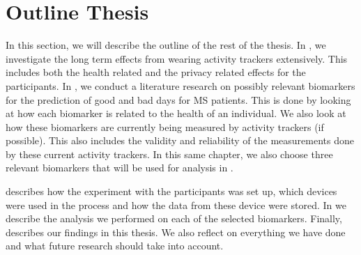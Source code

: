 \section{Outline Thesis}
In this section, we will describe the outline of the rest of the thesis. 
In , we investigate the long term effects from wearing activity trackers extensively.
This includes both the health related and the privacy related effects for the participants.
In , we conduct a literature research on possibly relevant biomarkers for the prediction of good and bad days for MS patients.
This is done by looking at how each biomarker is related to the health of an individual. 
We also look at how these biomarkers are currently being measured by activity trackers (if possible).
This also includes the validity and reliability of the measurements done by these current activity trackers.
In this same chapter, we also choose three relevant biomarkers that will be used for analysis in .

 describes how the experiment with the participants was set up, which devices were used in the process and how the data from these device were stored.
In  we describe the analysis we performed on each of the selected biomarkers.
Finally,  describes our findings in this thesis.
We also reflect on everything we have done and what future research should take into account.